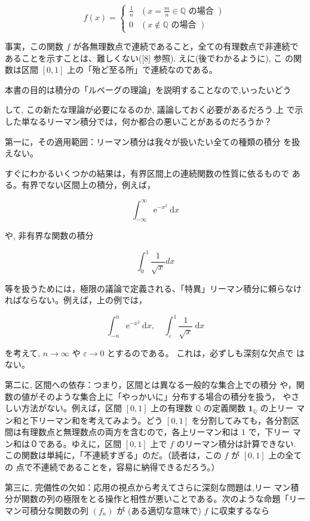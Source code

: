 \documentclass[14pt]{jsarticle}
\begin{document}
$$
f(x)= \begin{cases}\frac{1}{n} & \left(x=\frac{m}{n} \in \mathbb{Q} \text { の場合 }\right) \\ 0 & (x \notin \mathbb{Q} \text { の場合 })\end{cases}
$$

事実，この関数 $f$ が各無理数点で連続であること，全ての有理数点で非連続で あることを示すことは、難しくない([8] 参照). えに(後でわかるように), こ の関数は区間 $[0,1]$ 上の「殆ど至る所」で連続なのである。

本書の目的は積分の「ルベーグの理論」を説明することなので,いったいどう

して, この新たな理論が必要になるのか, 議論しておく必要があるだろう.上 で示した単なるリーマン積分では，何か都合の悪いことがあるのだろうか？

第一に，その適用範囲：リーマン積分は我々が扱いたい全ての種類の積分 を扱えない。

すぐにわかるいくつかの結果は，有界区間上の連続関数の性質に依るもので ある。有界でない区間上の積分，例えば，

$$
\int_{-\infty}^{\infty} \mathrm{e}^{-x^{2}} \mathrm{~d} x
$$

や, 非有界な関数の積分

$$
\int_{0}^{1} \frac{1}{\sqrt{x}} d x
$$

等を扱うためには，極限の議論で定義される、「特異」リーマン積分に頼らなけ ればならない。例えば，上の例では，

$$
\int_{-n}^{n} \mathrm{e}^{-x^{2}} \mathrm{~d} x, \quad \int_{\varepsilon}^{1} \frac{1}{\sqrt{x}} \mathrm{~d} x
$$

を考えて, $n \rightarrow \infty$ や $\varepsilon \rightarrow 0$ とするのである。 これは，必ずしも深刻な欠点で はない。

第二に, 区間への依存：つまり，区間とは異なる一般的な集合上での積分 や，関数の値がそのような集合上に「やっかいに」分布する場合の積分を扱う， やさしい方法がない。例えば，区間 $[0,1]$ 上の有理数 $\mathbb{Q}$ の定義関数 $\mathbf{1}_{\mathbb{Q}}$ の上リー マン和と下リーマン和を考えてみよう。どう $[0,1]$ を分割してみても，各分割区間は有理数点と無理数点の両方を含むので，各上リーマン和は 1 で，下リー マン和は０である。ゆえに，区間 $[0,1]$ 上で $f$ のリーマン積分は計算できない. この関数は単純に，「不連続すぎる」のだ。（読者は，この $f$ が $[0,1]$ 上の全ての 点で不連続であることを，容易に納得できるだろう。）

第三に, 完備性の欠如：応用の視点から考えてさらに深刻な問題は,リー マン積分が関数の列の極限をとる操作と相性が悪いことである。次のような命題「リーマン可積分な関数の列 $\left(f_{n}\right)$ が (ある適切な意味で) $f$ に収束するなら
\end{document}

